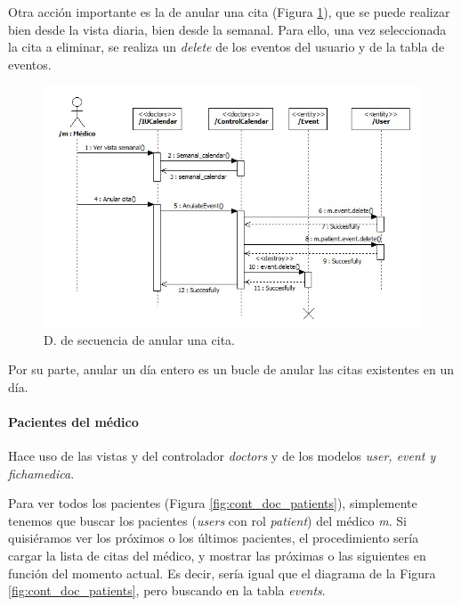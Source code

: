 					Otra acción importante es la de anular una cita (Figura \ref{fig:cont_doc_calendar_anular}), que se puede realizar bien desde la vista diaria, bien desde la semanal. Para ello, una vez seleccionada la cita a eliminar, se realiza un \textit{delete} de los eventos del usuario y de la tabla de eventos.
					
					\begin{figure}[H]
					  \centering
					    \includegraphics[width=14cm]{img/jpg/secuencia/5_doc_calendar_anular.jpg}
					  \caption{D. de secuencia de anular una cita.}
					  \label{fig:cont_doc_calendar_anular}
					\end{figure}
					
					Por su parte, anular un día entero es un bucle de anular las citas existentes en un día.
					
					
			
				\paragraph{Pacientes del médico} %
				\label{subp:cont_pacientes_del_medico}
				
					Hace uso de las vistas y del controlador \textit{doctors} y de los modelos \textit{user, event y fichamedica}.
					
					Para ver todos los pacientes (Figura \ref{fig:cont_doc_patients}), simplemente tenemos que buscar los pacientes (\textit{users} con rol \textit{patient}) del médico \textit{m}. Si quisiéramos ver los próximos o los últimos pacientes, el procedimiento sería cargar la lista de citas del médico, y mostrar las próximas o las siguientes en función del momento actual. Es decir, sería igual que el diagrama de la Figura \ref{fig:cont_doc_patients}, pero buscando en la tabla \textit{events}.
					

